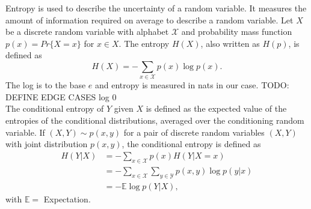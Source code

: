 Entropy is used to describe the uncertainty of a random variable. It measures the amount of information required on average to describe a random variable. Let $X$ be a discrete random variable with alphabet $\mathcal{X}$ and probability mass function $p(x)=Pr\{X=x\}$ for $x\in X$.
The entropy $H(X)$, also written as $H(p)$, is defined as
\begin{equation}
    H(X) = -\sum_{x \in \mathcal{X}} p(x) \log p(x).
\end{equation}
The log is to the base $e$ and entropy is measured in nats in our case. TODO: DEFINE EDGE CASES log 0 %
\\
The conditional entropy of $Y$ given $X$ is defined as the expected value of the entropies of the conditional distributions, averaged over the conditioning random variable. If $(X,Y) \sim p(x,y)$ for a pair of discrete random variables $(X,Y)$ with joint distribution $p(x,y)$, the conditional entropy is defined as
\begin{align}
    H(Y|X)&= -\sum_{x \in \mathcal{X}} p(x) H(Y|X=x) \\
    &= - \sum_{x \in \mathcal{X}} \sum_{y \in \mathcal{Y}}p(x,y) \log p(y|x) \\
    &= -\mathbb{E} \log p(Y|X),
\end{align}
with $\mathbb{E} =$ Expectation.


